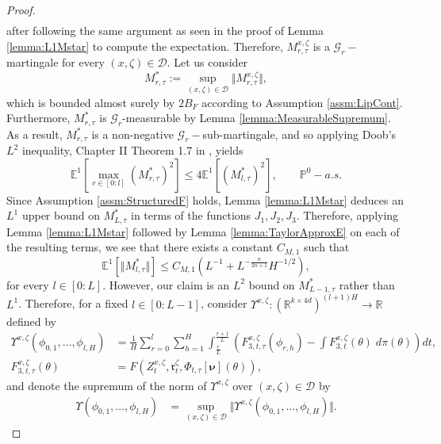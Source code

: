 \documentclass{article}
\newcommand{\R}{\mathbb{R}}
\begin{document}
\begin{appendices}
\begin{proof}
\begin{align*}
    \end{align*}
after following the same argument as seen in the proof of Lemma \ref{lemma:L1Mstar} to compute the expectation. Therefore, $M_{r,\tau}^{x,\zeta}$ is a $\mathcal G_{r}-$martingale for every $(x,\zeta)\in \mathscr D$. Let us consider
\begin{equation}\label{eqn:Mstar}
    M^*_{r,\tau}:=\sup_{(x,\zeta)\in \mathscr D} \Vert M_{r,\tau}^{x,\zeta}\Vert,
\end{equation}
which is bounded almost surely by $2B_F$ according to Assumption \ref{assm:LipCont}. Furthermore, $M^{*}_{r,\tau}$ is $\mathcal G_{r}$-measurable by Lemma \ref{lemma:MeasurableSupremum}.
As a result, $M^{*}_{r,\tau}$
is a non-negative $\mathcal G_{r}-$sub-martingale, and so applying Doob's $L^2$ inequality, Chapter II Theorem 1.7 in \cite{revuz2013continuous}, yields
\[
\mathbb E^1 \left[\max_{r\in[0:l]}
 \left( M^*_{r,\tau}\right)^2
 \right]\le  4\mathbb E^1 \left[
 \left( M^*_{l,\tau}\right)^2
 \right], \qquad\mathbb P^0-a.s.
\]
Since Assumption \ref{assm:StructuredF} holds, Lemma \ref{lemma:L1Mstar} deduces an $L^1$ upper bound on $M^*_{L,\tau}$ in terms of the functions $J_1, J_2,J_3$. Therefore, applying Lemma \ref{lemma:L1Mstar} followed by Lemma \ref{lemma:TaylorApproxE} on each of the resulting terms, we see that there exists a constant $C_{M,1}$ such that
\begin{equation}\label{eqn:EMstar1}
    \mathbb E^1 \left[ \Vert M^*_{l,\tau}\Vert\right]\le C_{M,1}\left(L^{-1}+ L^{-\frac{n}{2n+1}}H^{-1/2} \right),
\end{equation}
for every $l\in[0:L]$.
However, our claim is an $L^2$ bound on $M^*_{L-1,\tau}$ rather than $L^1$. Therefore, for a fixed $l\in[0:L-1]$, consider $\Upsilon^{x,\zeta}:(\R^{k \times 4d})^{(l+1)H}\to \R$ defined by
\begin{align*}
    \Upsilon^{x,\zeta}( \phi_{0,1},\ldots,\phi_{l,H}) &= \frac{1}{H}\sum_{r=0}^{l}\sum_{h=1}^H \int_\frac{r}{L}^\frac{r+1}{L} \left(F_{3,t,\tau}^{x,\zeta}( \phi_{r,h})-\int F_{3,t}^{x,\zeta}( \theta)\;d\pi(\theta)\right) dt,\\
    F_{3,t,\tau}^{x,\zeta}(\theta) &= F(Z^{x,\zeta}_t,\mathfrak{r}^\zeta_t, \Phi_{t,\tau}[\bm\nu](\theta)),
\end{align*}
and denote the supremum of the norm of $\Upsilon ^{x,\zeta}$ over $(x,\zeta)\in \mathscr D$ by
\begin{align*}
\Upsilon(\phi_{0,1},\ldots,\phi_{l,H})& = \sup_{(x,\zeta)\in \mathscr D} \Vert \Upsilon^{x,\zeta}( \phi_{0,1},\ldots,\phi_{l,H})\Vert.

\end{align*}
\end{proof}
\end{appendices}
\end{document}
